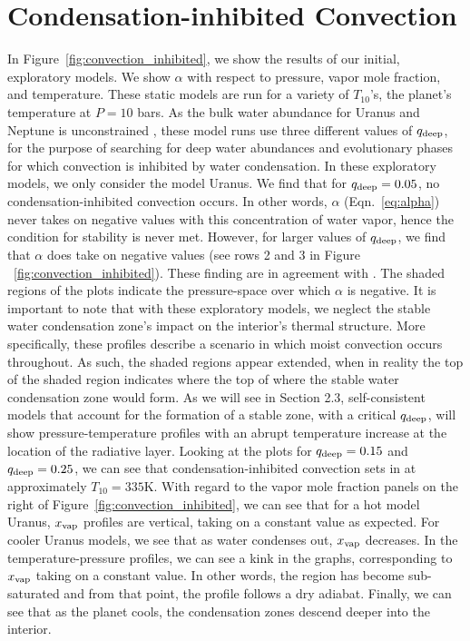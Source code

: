 \documentclass[11pt]{ucscthesisbs}
\begin{document}
\section{Condensation-inhibited Convection}
In Figure~\ref{fig:convection_inhibited}, we show the results of our initial, exploratory models. We show $\alpha$ with respect to pressure, vapor mole fraction, and temperature. These static models are run for a variety of $T_{10}$'s, the planet's temperature at $P=10$ bars. As the bulk water abundance for Uranus and Neptune is unconstrained \citep{guillot_1995}, these model runs use three different values of $q_{\rm deep}$, for the purpose of searching for deep water abundances and evolutionary phases for which convection is inhibited by water condensation. In these exploratory models, we only consider the model Uranus. We find that for $q_{\rm deep} = 0.05$, no condensation-inhibited convection occurs. In other words, $\alpha$ (Eqn.~\ref{eq:alpha})  never takes on negative values with this concentration of water vapor, hence the condition for stability is never met. However, for larger values of $q_{\rm deep}$, we find that $\alpha$ does take{} on negative values (see rows 2 and 3 in Figure ~\ref{fig:convection_inhibited}). These finding are in agreement with \citep{friedson_2017,leconte_2017}. The shaded regions of the plots indicate the pressure-space over which $\alpha$ is negative. It is important to note that with these exploratory models, we neglect the stable water condensation zone's impact on the interior's thermal structure. More specifically, these profiles describe a scenario in which moist convection occurs throughout. As such, the shaded regions appear extended, when in reality the top of the shaded region indicates where the top of where the stable water condensation zone would form. As we will see in Section 2.3, self-consistent models that account for the formation of a stable zone, with a critical $q_{\rm deep}$, will show pressure-temperature profiles with an abrupt temperature increase at the location of the radiative layer. Looking at the plots for $q_{\rm deep} = 0.15$ and $q_{\rm deep} = 0.25$, we can see that condensation-inhibited convection sets in at approximately $T_{10} = 335$K. With regard to the vapor mole fraction panels on the right of Figure~\ref{fig:convection_inhibited}, we can see that for a hot model Uranus, $x_{\rm vap}$ profiles are vertical, taking on a constant value as expected. For cooler Uranus models, we see that as water condenses out, $x_{\rm vap}$ decreases. In the temperature-pressure profiles, we can see a kink in the graphs, corresponding to $x_{\rm vap}$ taking on a constant value. In other words, the region has become sub-saturated and from that point, the profile follows a dry adiabat. Finally, we can see that as the planet cools, the condensation zones descend deeper into the interior.
\end{document}
